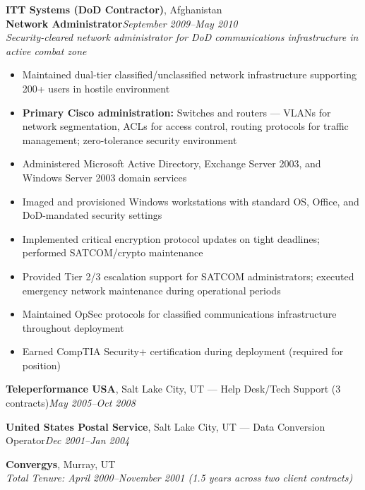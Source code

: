 \documentclass[9pt,letterpaper]{extarticle}
\begin{document}
\vspace{5pt}
\noindent\textbf{ITT Systems (DoD Contractor)}, Afghanistan\\
\textbf{Network Administrator}\hfill\textit{September 2009--May 2010}\\
\textit{Security-cleared network administrator for DoD communications infrastructure in active combat zone}
\begin{itemize}
  \item Maintained dual-tier classified/unclassified network infrastructure supporting 200+ users in hostile environment
  \item \textbf{Primary Cisco administration:} Switches and routers --- VLANs for network segmentation, ACLs for access control, routing protocols for traffic management; zero-tolerance security environment
  \item Administered Microsoft Active Directory, Exchange Server 2003, and Windows Server 2003 domain services
  \item Imaged and provisioned Windows workstations with standard OS, Office, and DoD-mandated security settings
  \item Implemented critical encryption protocol updates on tight deadlines; performed SATCOM/crypto maintenance
  \item Provided Tier 2/3 escalation support for SATCOM administrators; executed emergency network maintenance during operational periods
  \item Maintained OpSec protocols for classified communications infrastructure throughout deployment
  \item Earned CompTIA Security+ certification during deployment (required for position)
\end{itemize}

\vspace{3pt}
\noindent\textbf{Teleperformance USA}, Salt Lake City, UT --- Help Desk/Tech Support (3 contracts)\hfill\textit{May 2005--Oct 2008}

\vspace{3pt}
\noindent\textbf{United States Postal Service}, Salt Lake City, UT --- Data Conversion Operator\hfill\textit{Dec 2001--Jan 2004}

\vspace{5pt}
\noindent\textbf{Convergys}, Murray, UT\\
\textit{Total Tenure: April 2000--November 2001 (1.5 years across two client contracts)}
\end{document}
